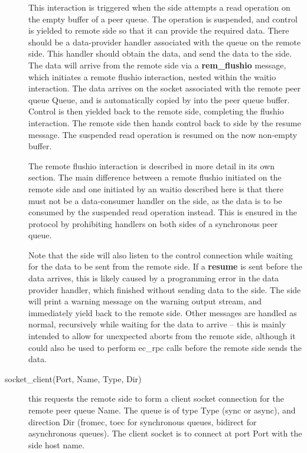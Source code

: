 \begin{description}
This interaction is triggered when the {\eclipse} side attempts a read
operation on the empty buffer of a peer queue. The operation is suspended, 
and control is yielded to remote side so that it can provide
the required data. There should be a data-provider handler associated with
the queue on the remote side. This handler should obtain the data, and send
the data to the {\eclipse} side. The data will arrive from the remote side via a
{\bf rem_flushio} message, which initiates a remote flushio interaction, nested
within the {\eclipse} waitio interaction. The data arrives on the socket
associated with the remote peer queue Queue, and is automatically copied by
{\eclipse} into the peer queue buffer. Control is then yielded back to 
the remote side, completing the flushio interaction. The remote side then
hands control back to {\eclipse} side by the resume message. The suspended
read operation is resumed on the now non-empty buffer. 

The remote flushio interaction is described in more detail in its own
section. The main difference between a remote flushio initiated on the
remote side and one initiated by an {\eclipse} waitio described here is
that there must not be a data-consumer handler on the {\eclipse} side, as
the data is to be consumed by the suspended read operation instead.
This is ensured in the protocol by prohibiting handlers on both sides 
of a synchronous peer queue.

Note that the {\eclipse} side will also listen to the control connection
while waiting for the data to be sent from the remote side. If a {\bf
resume} is sent before the data arrives, this is likely caused by a
programming error in the data provider handler, which finished without
sending data to the {\eclipse} side. The {\eclipse} side will print a
warning message on the warning output stream, and immediately yield
back to the remote side. Other messages are handled as normal, recursively
while waiting for the data to arrive -- this is mainly intended to allow
for unexpected aborts from the remote side, although it could also be used to
perform ec_rpc calls before the remote side sends the data.

\item[socket_client(Port, Name, Type, Dir)] this requests the remote side
to form a client socket connection for the remote peer queue Name. The
queue is of type Type (sync or async), and direction Dir (fromec, toec for
synchronous queues, bidirect for asynchronous queues). The client socket is
to connect at port Port with the {\eclipse} side host name.  


\end{description}
